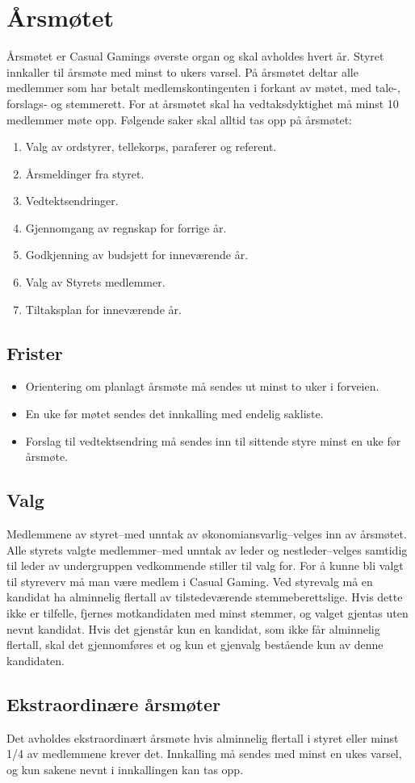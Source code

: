 \chapter{Årsmøtet}
Årsmøtet er Casual Gamings øverste organ og skal avholdes hvert år. Styret innkaller til årsmøte med minst to ukers varsel. På årsmøtet deltar alle medlemmer som har betalt medlemskontingenten i forkant av møtet, med tale-, forslags‐ og stemmerett. For at årsmøtet skal ha vedtaksdyktighet må minst 10 medlemmer møte opp. Følgende saker skal alltid tas opp på årsmøtet:
\begin{enumerate}
    \item Valg av ordstyrer, tellekorps, paraferer og referent.
    \item Årsmeldinger fra styret.
    \item Vedtektsendringer.
    \item Gjennomgang av regnskap for forrige år.
    \item Godkjenning av budsjett for inneværende år.
    \item Valg av Styrets medlemmer.
    \item Tiltaksplan for inneværende år.
\end{enumerate}

\section{Frister}
\begin{itemize}
    \item Orientering om planlagt årsmøte må sendes ut minst to uker i forveien.
    \item En uke før møtet sendes det innkalling med endelig sakliste.
    \item Forslag til vedtektsendring må sendes inn til sittende styre minst en uke før årsmøte.
\end{itemize}

\section{Valg}
Medlemmene av styret–med unntak av økonomiansvarlig–velges inn av årsmøtet. Alle styrets valgte medlemmer–med unntak av leder og nestleder–velges samtidig til leder av undergruppen vedkommende stiller til valg for. For å kunne bli valgt til styreverv må man være medlem i Casual Gaming. Ved styrevalg må en kandidat ha alminnelig flertall av tilstedeværende stemmeberettslige. Hvis dette ikke er tilfelle, fjernes motkandidaten med minst stemmer, og valget gjentas uten nevnt kandidat. Hvis det gjenstår kun en kandidat, som ikke får alminnelig flertall, skal det gjennomføres et og kun et gjenvalg bestående kun av denne kandidaten.

\section{Ekstraordinære årsmøter}
Det avholdes ekstraordinært årsmøte hvis alminnelig flertall i styret eller minst 1/4 av medlemmene krever det. Innkalling må sendes med minst en ukes varsel, og kun sakene nevnt i innkallingen kan tas opp.
